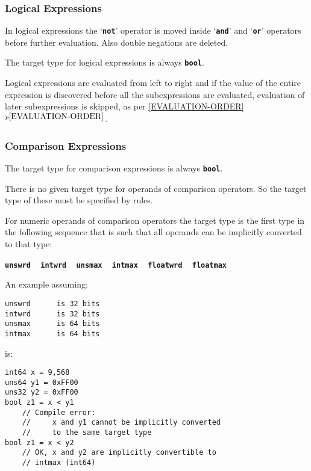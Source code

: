 \documentclass[12pt]{article}
\newcommand{\TT}[1]{{\tt \bfseries #1}}
\newcommand{\itemref}[1]{\ref{#1}$^{p\pageref{#1}}$}
\newenvironment{indpar}[1][0.3in]%
	{\begin{list}{}%
		     {\setlength{\itemsep}{0in}%
		      \setlength{\topsep}{0in}%
		      \setlength{\parsep}{1ex}%
		      \setlength{\labelwidth}{#1}%
		      \setlength{\leftmargin}{#1}%
		      \addtolength{\leftmargin}{\labelsep}}%
	 \item}%
	{\end{list}}
\begin{document}
\subsubsection{Logical Expressions}

In logical expressions the `\TT{not}' operator is moved inside
`\TT{and}' and `\TT{or}' operators before further evaluation.
Also double negations are deleted.

The target type for logical expressions is always \TT{bool}.

Logical expressions are evaluated from left to right and
if the value of the entire expression is discovered before all
the subexpressions are evaluated, evaluation of later subexpressions is
skipped, as per \itemref{EVALUATION-ORDER}.

\subsubsection{Comparison Expressions}
\label{COMPARISON-EXPRESSIONS}

The target type for comparison expressions is always \TT{bool}.

There is no given target type for operands of comparison operators.
So the target type of these must be specified by rules.

For numeric operands of comparison operators
the target type is the first type
in the following sequence that is such that all operands
can be implicitly converted to that type:
\begin{center}
\TT{unswrd} ~ \TT{intwrd} ~ \TT{unsmax} ~ \TT{intmax}
           ~ \TT{floatwrd} ~ \TT{floatmax}
\end{center}

An example assuming:


\begin{indpar}\begin{verbatim}
unswrd      is 32 bits
intwrd      is 32 bits
unsmax      is 64 bits
intmax      is 64 bits
\end{verbatim}\end{indpar}

is:

\begin{indpar}\begin{verbatim}
int64 x = 9,568
uns64 y1 = 0xFF00
uns32 y2 = 0xFF00
bool z1 = x < y1
    // Compile error:
    //     x and y1 cannot be implicitly converted
    //     to the same target type
bool z1 = x < y2
    // OK, x and y2 are implicitly convertible to
    // intmax (int64)
\end{verbatim}\end{indpar}
\end{document}
